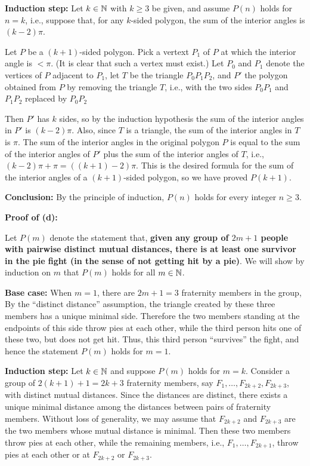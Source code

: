 \textbf{Induction step:} Let $k\in\mathbb{N}$ with $k\ge 3$ be given, and
assume $P(n)$ holds for $n=k$, i.e., suppose that, for any $k$-sided polygon,
the sum of the interior angles is $(k-2)\pi$. 


Let $P$ be a $(k+1)$-sided polygon. Pick a vertext $P_1$ of $P$ at which the
interior angle is $<\pi$. (It is clear that such a vertex must exist.)
Let $P_0$ and $P_1$ denote the vertices of $P$ adjacent to $P_1$,
let $T$ be the triangle $P_0P_1P_2$, and 
$P'$ the polygon obtained from $P$ by removing the triangle $T$,
i.e., with the two sides $P_0P_1$ and $P_1P_2$ replaced by $P_0P_2$

Then $P'$ has $k$ sides, so by the induction hypothesis the sum of the
interior angles in $P'$ is $(k-2)\pi$. Also, since $T$ is a triangle,
the sum of the interior angles in $T$ is $\pi$.  
The sum of the interior angles in the original polygon $P$ is equal
to the sum of the interior angles of $P'$ plus the sum of the interior
angles of $T$, i.e.,  $(k-2)\pi + \pi = ((k+1)-2)\pi$. 
This is the desired formula for the sum of the interior angles of a
$(k+1)$-sided polygon, so we have proved $P(k+1)$. 

\textbf{Conclusion:} By the principle of induction, $P(n)$ holds for
every integer $n\ge3$.

\textbf{Proof of (d):}

Let $P(m)$ denote the statement that,  \textbf{given any group of $2m+1$ people
with pairwise distinct mutual distances, there is at least one survivor in the
pie fight (in the sense of not getting hit by a pie)}.
We will show by induction on $m$ that $P(m)$ holds for all $m\in\mathbb{N}$.

\textbf{Base case:} When $m=1$, there are $2m+1=3$ fraternity members in the
group, By the ``distinct distance'' assumption, the triangle created by these
three members has a unique minimal side. Therefore the two members standing at
the endpoints of this side throw pies at each other, while the third person
hits one of these two, but does not get hit. Thus, this third person
``survives'' the fight, and hence the statement $P(m)$ holds for $m=1$.

\textbf{Induction step:} Let $k\in\mathbb{N}$ and suppose $P(m)$ holds for $m=k$.
Consider a group of $2(k+1)+1=2k+3$ fraternity members, say
$F_1,\dots,F_{2k+2},F_{2k+3}$,
with distinct mutual distances.  Since the distances are
distinct, there exists a unique minimal distance among the distances between
pairs of fraternity members. Without loss of generality, we may assume that
$F_{2k+2}$ and $F_{2k+3}$ are the two members whose mutual distance is minimal. 
Then these two members throw pies at each other, while the remaining members, 
i.e., $F_1,\dots, F_{2k+1}$, throw pies at each other or at $F_{2k+2}$
or $F_{2k+3}$. 

